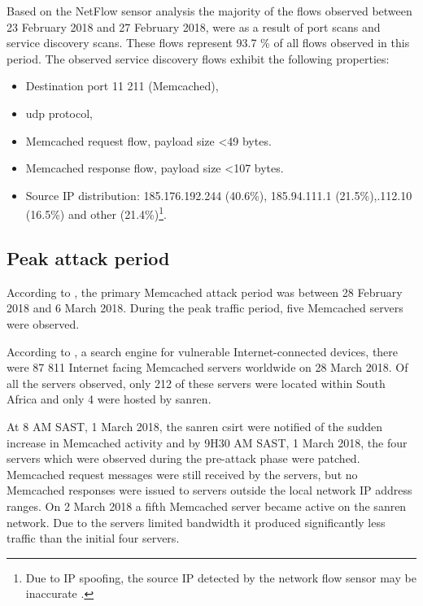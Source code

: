 Based on the NetFlow sensor analysis the majority of the flows observed between 23 February 2018 and 27 February 2018, were as a result of port scans and service discovery scans. These flows represent 93.7 \% of all flows observed in this period. The observed service discovery flows exhibit the following properties:
\begin{itemize}
    \item Destination port 11 211 (Memcached),
    \item \gls{udp} protocol,
    \item Memcached request flow, payload size  \textless 49 bytes.
    \item Memcached response flow, payload size  \textless 107 bytes.
    \item Source IP distribution:   185.176.192.244 (40.6\%),  185.94.111.1 (21.5\%),.112.10 (16.5\%) and other (21.4\%)\footnote{Due to IP spoofing, the source IP detected by the network flow sensor may be inaccurate \cite{senie1998network}.}.
\end{itemize}

\subsection{Peak attack period}
\label{sub-during-attack}

According to \cite{Akamai2018Memcached}, the primary Memcached attack period was between 28 February 2018 and 6 March 2018. During the peak traffic period, five Memcached servers were observed.

According to \cite{Shodan}, a search engine for vulnerable Internet-connected devices, there were 87 811 Internet facing Memcached servers worldwide on 28 March 2018. Of all the servers observed, only 212 of these servers were located within South Africa and only 4 were hosted by \gls{sanren}.


At 8 AM SAST, 1 March 2018, the \gls{sanren} \gls{csirt} were notified of the sudden increase in Memcached activity and by 9H30 AM SAST, 1 March 2018, the four servers which were observed during the pre-attack phase were patched. Memcached request messages were still received by the servers, but no Memcached responses were issued to servers outside the local network IP address ranges. On 2 March 2018 a fifth Memcached server became active on the \gls{sanren} network. Due to the servers limited bandwidth it produced significantly less traffic than the initial four servers.  

